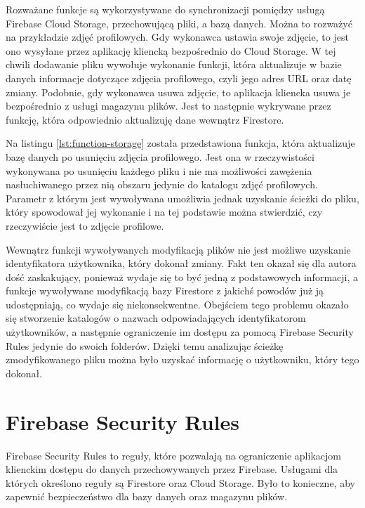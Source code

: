 Rozważane funkcje są wykorzystywane do synchronizacji pomiędzy usługą Firebase Cloud Storage, przechowującą pliki, a bazą danych. Można to rozważyć na przykładzie zdjęć profilowych. Gdy wykonawca ustawia swoje zdjęcie, to jest ono wysyłane przez aplikację kliencką bezpośrednio do Cloud Storage. W tej chwili dodawanie pliku wywołuje wykonanie funkcji, która aktualizuje w bazie danych informacje dotyczące zdjęcia profilowego, czyli jego adres URL oraz datę zmiany. Podobnie, gdy wykonawca usuwa zdjęcie, to aplikacja kliencka usuwa je bezpośrednio z usługi magazynu plików. Jest to następnie wykrywane przez funkcję, która odpowiednio aktualizuję dane wewnątrz Firestore.

Na listingu \ref{lst:function-storage} została przedstawiona funkcja, która aktualizuje bazę danych po usunięciu zdjęcia profilowego. Jest ona w rzeczywistości wykonywana po usunięciu każdego pliku i nie ma możliwości zawężenia nasłuchiwanego przez nią obszaru jedynie do katalogu zdjęć profilowych. Parametr z którym jest wywoływana umożliwia jednak uzyskanie ścieżki do pliku, który spowodował jej wykonanie i na tej podstawie można stwierdzić, czy rzeczywiście jest to zdjęcie profilowe.

\begin{minipage}{\linewidth}

\end{minipage}

Wewnątrz funkcji wywoływanych modyfikacją plików nie jest możliwe uzyskanie identyfikatora użytkownika, który dokonał zmiany. Fakt ten okazał się dla autora dość zaskakujący, ponieważ wydaje się to być jedną z podstawowych informacji, a funkcje wywoływane modyfikacją bazy Firestore z jakichś powodów już ją udostępniają, co wydaje się niekonsekwentne. Obejściem tego problemu okazało się stworzenie katalogów o nazwach odpowiadających identyfikatorom użytkowników, a następnie ograniczenie im dostępu za pomocą Firebase Security Rules jedynie do swoich folderów. Dzięki temu analizując ścieżkę zmodyfikowanego pliku można było uzyskać informację o użytkowniku, który tego dokonał.

\section{Firebase Security Rules}
\label{projekt-reguły}

Firebase Security Rules to reguły, które pozwalają na ograniczenie aplikacjom klienckim dostępu do danych przechowywanych przez Firebase. Usługami dla których określono reguły są Firestore oraz Cloud Storage. Było to konieczne, aby zapewnić bezpieczeństwo dla bazy danych oraz magazynu plików.


